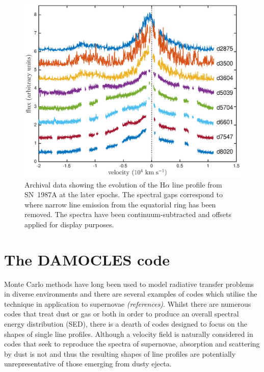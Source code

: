 \documentclass[useAMS,usenatbib,usegraphicx]{mnras}
\begin{document}
\begin{figure}
\includegraphics[trim =45 10 45 15,clip=true,scale=0.51]{Ha_evol_late_1col}
\caption{Archival data showing the evolution of the H$\alpha$
line profile from SN~1987A at the later epochs. The spectral gaps 
correspond to where narrow line emission from the equatorial ring has been 
removed. The spectra have been continuum-subtracted and offsets applied 
for display purposes.}
\label{Ha_evol_late}
\end{figure}

\section{The DAMOCLES code}
\label{code}

Monte Carlo methods have long been used to model radiative transfer 
problems in diverse environments and there are several examples of codes 
which utilise the technique in application to supernovae 
\textit{(references)}.  Whilst there are numerous codes that 
treat dust or gas or both in order to produce an overall spectral energy 
distribution (SED), there is a dearth of codes designed to focus on the 
shapes of single line profiles.  Although a velocity field is naturally 
considered in codes that seek to reproduce the spectra of supernovae, 
absorption and scattering by dust is not and thus the resulting shapes of 
line profiles are potentially unrepresentative of those emerging from 
dusty ejecta.
\end{document}
